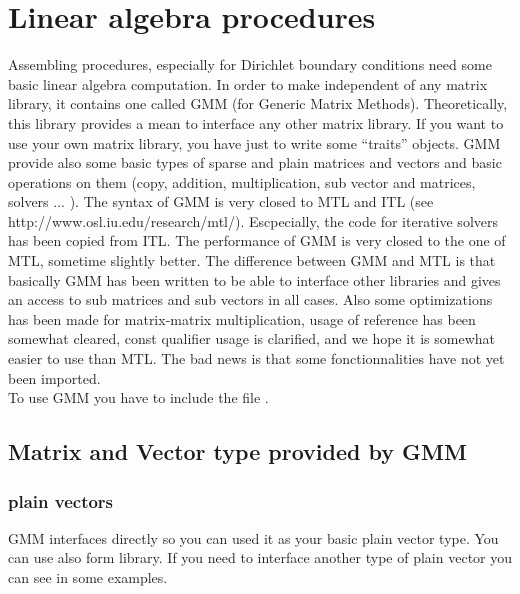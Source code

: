 \documentclass[11pt,a4paper]{article}
\begin{document}
\section{Linear algebra procedures}
Assembling procedures, especially for Dirichlet boundary conditions need some basic linear algebra computation. In order to make \gf  independent of any matrix library, it contains one called GMM (for Generic Matrix Methods). Theoretically, this library provides a mean to interface any other matrix library. If you want to use your own matrix library, you have just to write some ``traits'' objects. GMM provide also some basic types of sparse and plain matrices and vectors and basic operations on them (copy, addition, multiplication, sub vector and matrices, solvers ... ). The syntax of GMM is very closed to MTL and ITL (see http://www.osl.iu.edu/research/mtl/). Escpecially, the code for iterative solvers has been copied from ITL. The performance of GMM is very closed to the one of MTL, sometime slightly better. The difference between GMM and MTL is that basically GMM has been written to be able to interface other libraries and gives an access to sub matrices and sub vectors in all cases. Also some optimizations has been made for matrix-matrix multiplication, usage of reference has been somewhat cleared, const qualifier usage is clarified, and we hope it is somewhat easier to use than MTL. The bad news is that some fonctionnalities have not yet been imported.\\

To use GMM you have to include the file .

\subsection{Matrix and Vector type provided by GMM}

\subsubsection{plain vectors}
GMM interfaces directly  so you can used it as your basic plain vector type. You can use also  form  library. If you need to interface another type of plain vector you can see in  some examples.\\
\end{document}

